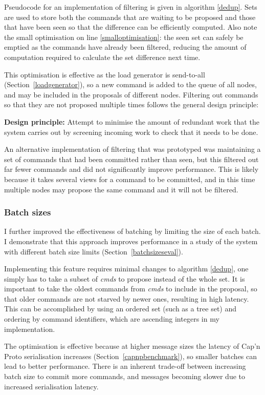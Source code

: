 Pseudocode for an implementation of filtering is given in algorithm \ref{dedup}. Sets are used to store both the commands that are waiting to be proposed and those that have been seen so that the difference can be efficiently computed. Also note the small optimisation on line \ref{smalloptimisation}: the seen set can safely be emptied as the commands have already been filtered, reducing the amount of computation required to calculate the set difference next time.

This optimisation is effective as the load generator is send-to-all (Section~\ref{loadgenerator}), so a new command is added to the queue of all nodes, and may be included in the proposals of different nodes. Filtering out commands so that they are not proposed multiple times follows the general design principle:

\textbf{Design principle: } Attempt to minimise the amount of redundant work that the system carries out by screening incoming work to check that it needs to be done.

An alternative implementation of filtering that was prototyped was maintaining a set of commands that had been committed rather than seen, but this filtered out far fewer commands and did not significantly improve performance. This is likely because it takes several views for a command to be committed, and in this time multiple nodes may propose the same command and it will not be filtered.

\subsubsection{Batch sizes} \label{batchsizes}
I further improved the effectiveness of batching by limiting the size of each batch. I demonstrate that this approach improves performance in a study of the system with different batch size limits (Section~\ref{batchsizeseval}).

Implementing this feature requires minimal changes to algorithm \ref{dedup}, one simply has to take a subset of \textit{cmds} to propose instead of the whole set. It is important to take the oldest commands from \textit{cmds} to include in the proposal, so that older commands are not starved by newer ones, resulting in high latency. This can be accomplished by using an ordered set (such as a tree set) and ordering by command identifiers, which are ascending integers in my implementation.

The optimisation is effective because at higher message sizes the latency of Cap'n Proto serialisation increases (Section~\ref{capnpbenchmark}), so smaller batches can lead to better performance. There is an inherent trade-off between increasing batch size to commit more commands, and messages becoming slower due to increased serialisation latency.

